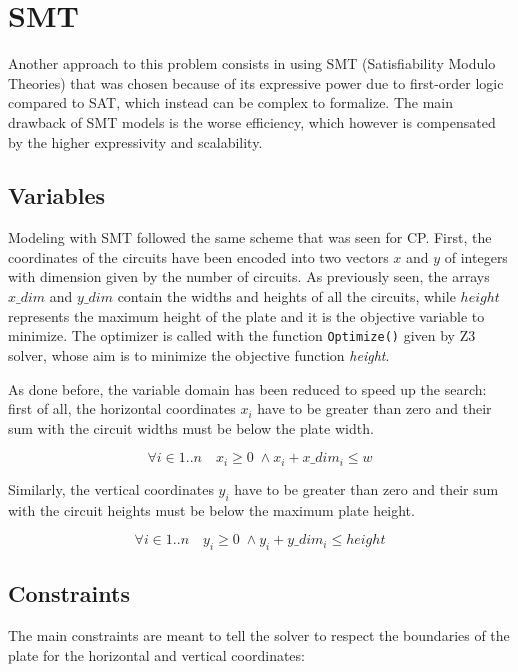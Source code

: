 \section{SMT}

Another approach to this problem consists in using SMT (Satisfiability Modulo Theories) that was chosen because of its expressive power due to first-order logic compared to SAT, which instead can be complex to formalize. The main drawback of SMT models is the worse efficiency, which however is compensated by the higher expressivity and scalability.

\subsection{Variables}

Modeling with SMT followed the same scheme that was seen for CP.
First, the coordinates of the circuits have been encoded into two vectors $x$ and $y$ of integers with dimension given by the number of circuits.
As previously seen, the arrays $x\_dim$ and $y\_dim$ contain the widths and heights of all the circuits, while $height$ represents the maximum height of the plate and it is the objective variable to minimize.
The optimizer is called with the function \verb|Optimize()| given by Z3 solver, whose aim is to minimize the objective function \textit{height}.

As done before, the variable domain has been reduced to speed up the search: first of all, the horizontal coordinates $x_i$ have to be greater than zero and their sum with the circuit widths must be below the plate width.

\begin{equation*}
    \forall i \in {1..n} \quad x_i \geq 0 \; \land x_i + x\_dim_i \leq w
\end{equation*}

Similarly, the vertical coordinates $y_i$ have to be greater than zero and their sum with the circuit heights must be below the maximum plate height.

\begin{equation*}
     \forall i \in {1..n} \quad y_i \geq 0 \; \land y_i + y\_dim_i \leq height
\end{equation*}

\subsection{Constraints}

The main constraints are meant to tell the solver to respect the boundaries of the plate for the horizontal and vertical coordinates:

